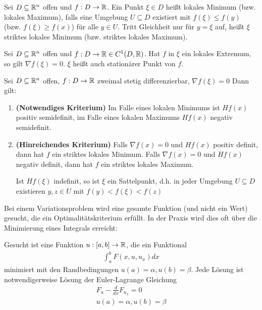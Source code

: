 \begin{definition}
	Sei $D \subseteq \mathbb{R}^n$ offen und $f : D \rightarrow \mathbb{R}$. Ein Punkt $\xi \in D$ heißt lokales Minimum (bzw. lokales Maximum), falls eine Umgebung $U \subseteq D$ existiert mit $f(\xi) \leq f(y)$ (bzw. $f(\xi) \geq f(x)$) für alle $y \in U$. Tritt Gleichheit nur für $y = \xi$ auf, heißt $\xi$ striktes lokales Minimum (bzw. striktes lokales Maximum).
\end{definition}

\begin{satz}
	Sei $D \subseteq \mathbb{R}^n$ offen und $f : D \rightarrow \mathbb{R} \in C^{1}(D,\mathbb{R})$. Hat $f$ in $\xi$ ein lokales Extremum, so gilt $\nabla f(\xi) = 0$. $\xi$ heißt auch stationärer Punkt von $f$.
\end{satz}

\begin{satz}
	Sei $D \subseteq \mathbb{R}^n$ offen, $f : D \rightarrow \mathbb{R}$ zweimal stetig differenzierbar, $ \nabla f(\xi) = 0$ Dann gilt:
	
	\begin{enumerate}[noitemsep]
		\item \textbf{(Notwendiges Kriterium)} Im Falle eines lokalen Minimums ist $Hf(x)$ positiv semidefinit, im Falle eines lokalen Maximums $Hf(x)$ negativ semidefinit.
		\item \textbf{(Hinreichendes Kriterium)} Falls $\nabla f(x) = 0$ und $Hf(x)$ positiv definit, dann hat $f$ ein striktes lokales Minimum. Falls $\nabla f(x) = 0$ und $Hf(x)$ negativ definit, dann hat $f$ ein striktes lokales Maximum. 
		
		Ist $Hf(\xi)$ indefinit, so ist $\xi$ ein Sattelpunkt, d.h. in jeder Umgebung $U \subseteq D$ existieren $y,z \in U$ mit $f(y) < f(\xi) < f(z)$
	\end{enumerate}
\end{satz}

\begin{definition}[Variationsproblem]
	Bei einem Variationsproblem wird eine gesamte Funktion (und nicht ein Wert) gesucht, die ein Optimalitätskriterium erfüllt. In der Praxis wird dies oft über die Minimierung eines Integrals erreicht:
	
\end{definition}

\begin{satz}
	Gesucht ist eine Funktion $u : [a,b] \rightarrow \mathbb{R}$, die ein Funktional
	\begin{align*}
		\int_{a}^{b}F(x,u,u_x) dx
	\end{align*}
	minimiert mit den Randbedingungen $u(a) = \alpha, u(b) = \beta$.
	Jede Lösung ist notwendigerweise Lösung der Euler-Lagrange Gleichung
	\begin{align*}
		F_u - \frac{d}{dx}F_{u_x} = 0 \\
		u(a) = \alpha, u(b) = \beta
	\end{align*}
\end{satz}




